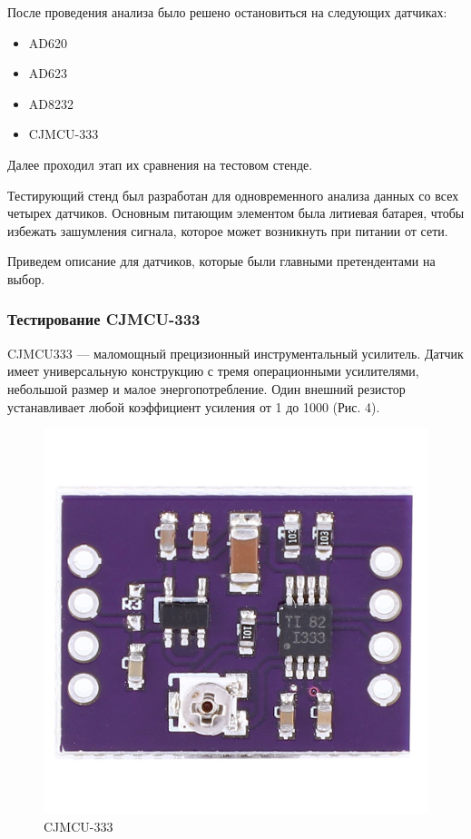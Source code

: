 \documentclass[12pt, russian]{extarticle}
\begin{document}
\begin{spacing}{1.5}
После проведения анализа было решено остановиться на следующих датчиках: 

\begin{itemize}
    \item AD620
    \item AD623
    \item AD8232
    \item CJMCU-333
\end{itemize}

Далее проходил этап их сравнения на тестовом стенде.

Тестирующий стенд был разработан для одновременного анализа данных со всех четырех датчиков.
Основным питающим элементом была литиевая батарея, чтобы избежать зашумления сигнала, которое может возникнуть при питании от сети.

Приведем описание для датчиков, которые были главными претендентами на выбор.

\subsubsection{Тестирование CJMCU-333}

CJMCU333 — маломощный прецизионный инструментальный усилитель. Датчик имеет универсальную конструкцию с тремя операционными усилителями, небольшой размер и малое энергопотребление. Один внешний резистор устанавливает любой коэффициент усиления от 1 до 1000 (Рис. 4).

\begin{figure}[htbp]
\centering
\includegraphics[scale=0.15]{resources/cjmcu333/cjmcu-333.png}
\caption{CJMCU-333}
\label{fig:my_label}
\end{figure}


\end{spacing}
\end{document}
